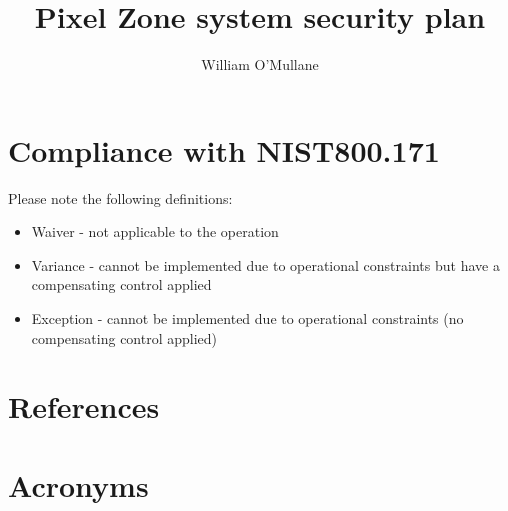 \documentclass[OPS,lsstdraft,authoryear,toc]{lsstdoc}
\title{Pixel Zone  system security plan}
\author{%
William O'Mullane
}
\date{\vcsDate}
\begin{document}
\maketitle



\appendix
\section{Compliance with NIST800.171} \label{sec:compliance}
Please note the following definitions:
\begin{itemize}
\item Waiver - not applicable to the operation
\item Variance - cannot be implemented due to operational constraints but have a compensating control applied
\item Exception - cannot be implemented due to operational constraints (no compensating control applied)
\end{itemize}


\section{References} \label{sec:bib}
\renewcommand{\refname}{} %


\section{Acronyms} \label{sec:acronyms}

\end{document}
